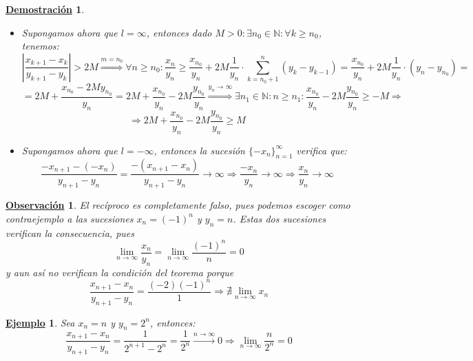 \documentclass[10pt,a4paper,openright]{book}
\theoremstyle{break}
\newtheorem*{demo}{\underline{Demostración}}
\newtheorem{obs}{\underline{Observación}}[chapter]
\newtheorem{ej}{\underline{Ejemplo}}[chapter]
\begin{document}
\begin{demo}
\begin{itemize}
\item Supongamos ahora que $l=\infty$, entonces dado $M>0: \exists n_0\in \mathbb N: \forall k\geq n_0$, tenemos:
$$\left|\frac{x_{k+1}-x_{k}}{y_{k+1}-y_k}\right|>2M\stackrel{m=n_0}{\Rightarrow} \forall n\geq n_0: \frac{x_n}{y_n}\geq \frac{x_{n_0}}{y_n}+ 2M\frac{1}{y_n}\cdot \sum_{k=n_0+1}^n (y_k-y_{k-1})=\frac{x_{n_0}}{y_n}+ 2M\frac{1}{y_n}\cdot (y_n-y_{n_0})=$$
$$=2M + \frac{x_{n_0}-2My_{n_0}}{y_n}=2M + \frac{x_{n_0}}{y_n}-2M\frac{y_{n_0}}{y_n}\stackrel{y_n\rightarrow \infty}{\Rightarrow} \exists n_1\in \mathbb N: n\geq n_1: \frac{x_{n_0}}{y_n}-2M\frac{y_{n_0}}{y_n}\geq -M\Rightarrow $$
$$\Rightarrow 2M + \frac{x_{n_0}}{y_n}-2M\frac{y_{n_0}}{y_n}\geq M$$

\item Supongamos ahora que $l=-\infty$, entonces la sucesión $\{-x_n\}_{n=1}^\infty$ verifica que:
$$\frac{-x_{n+1}-(-x_n)}{y_{n+1}-y_n}=\frac{-(x_{n+1}-x_n)}{y_{n+1}-y_n} \rightarrow\infty \Rightarrow \frac{-x_n}{y_n}\rightarrow \infty\Rightarrow \frac{x_n}{y_n}\rightarrow \infty$$
\end{itemize}
\end{demo}

\begin{obs}
El recíproco es completamente falso, pues podemos escoger como contraejemplo a las sucesiones $x_n = (-1)^n$ y $y_n = n$. Estas dos sucesiones verifican la consecuencia, pues
\[
\lim_{n\rightarrow \infty} \frac{x_n}{y_n} = \lim_{n\rightarrow \infty} \frac{(-1)^n}{n}=0
\]
y aun así no verifican la condición del teorema porque
\[
\frac{x_{n+1}-x_n}{y_{n+1}-y_n}=\frac{(-2)(-1)^n}{1}\Rightarrow \nexists \lim_{n\rightarrow\infty} x_n
\]
\end{obs}

\begin{ej}
Sea $x_n=n$ y $y_n=2^n$, entonces:
$$\frac{x_{n+1}-x_n}{y_{n+1}-y_n}=\frac{1}{2^{n+1}-2^n}=\frac{1}{2^n}\stackrel{n\rightarrow \infty}{\rightarrow} 0\Rightarrow \lim_{n\rightarrow \infty}\frac{n}{2^n}=0$$
\end{ej}
\end{document}
